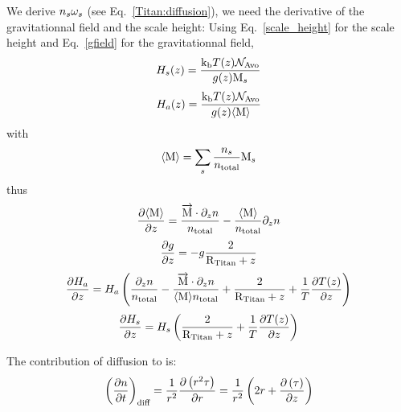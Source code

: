 We derive $n_s\omega_s$ (see Eq.~\ref{Titan:diffusion}),
we need the derivative of the gravitationnal field and the scale height:
Using Eq.~\ref{scale_height} for the scale height and Eq.~\ref{gfield}
for the gravitationnal field,
\begin{equation}
H_s(z) = \frac{\text{k}_\text{b} T(z) \mathcal{N}_\text{Avo}}{g(z)\text{M}_s}
\label{Titan:scale_height_spec}
\end{equation}
\begin{equation}
H_a(z) = \frac{\text{k}_\text{b} T(z) \mathcal{N}_\text{Avo}}{g(z)\langle\text{M}\rangle}
\label{Titan:scale_height_atm}
\end{equation}
with
\begin{equation}
\langle\text{M}\rangle = \sum_s \frac{n_s}{n_\text{total}} \text{M}_s
\end{equation}
thus
\begin{equation}
\frac{\partial\langle\text{M}\rangle}{\partial z} =   \frac{\overrightarrow{\text{M}}\cdot\partial_{z}{n}}{n_\text{total}}
                        - \frac{\langle\text{M}\rangle}{n_\text{total}}\partial_{z}{n}
\end{equation}
\begin{equation}
\frac{\partial g}{\partial z} = -   g \frac{2}{\text{R}_\text{Titan} + z}
\end{equation}
\begin{equation}
\frac{\partial H_a}{\partial z} = H_a \left(\frac{\partial_{z}{n}}{n_\text{total}}
                                - \frac{\overrightarrow{\text{M}}\cdot\partial_{z}{n}}{\langle\text{M}\rangle n_\text{total}}
                                + \frac{2}{\text{R}_\text{Titan} + z} 
                                + \frac{1}{T}\frac{\partial T(z)}{\partial z}\right)
\end{equation}
\begin{equation}
\frac{\partial H_s}{\partial z} = H_s\left(\frac{2}{\text{R}_\text{Titan} + z} + \frac{1}{T}\frac{\partial T(z)}{\partial z}\right) 
\end{equation}

The contribution of diffusion to  is:
\begin{equation}
\left(\frac{\partial n}{\partial t}\right)_{\text{diff}} = \frac{1}{r^2}\frac{\partial\left(r^2\tau\right)}{\partial r}
                                             = \frac{1}{r^2}\left(2 r + \frac{\partial\left(\tau\right)}{\partial z}\right)
\label{Titan:diffusion}
\end{equation}

